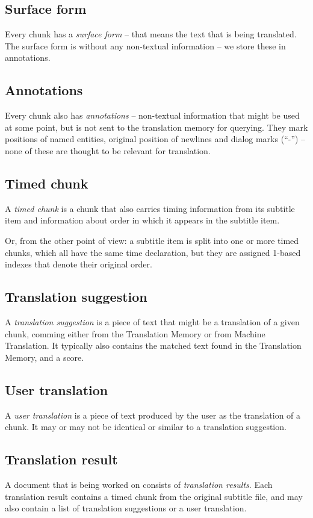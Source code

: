 \subsection*{Surface form}
Every chunk has a \emph{surface form} -- that means the text that is being translated. The surface form is without any non-textual information -- we store these in annotations.

\subsection*{Annotations}
Every chunk also has \emph{annotations} -- non-textual information that might be used at some point, but is not sent to the translation memory for querying. They mark positions of named entities, original position of newlines and dialog marks (``-'') -- none of these are thought to be relevant for translation.

\subsection*{Timed chunk}
A \emph{timed chunk} is a chunk that also carries timing information from its subtitle item and information about order in which it appears in the subtitle item.

Or, from the other point of view: a subtitle item is split into one or more timed chunks, which all have the same time declaration, but they are assigned 1-based indexes that denote their original order.

\subsection*{Translation suggestion}
A \emph{translation suggestion} is a piece of text that might be a translation of a given chunk, comming either from the Translation Memory or from Machine Translation. It typically also contains the matched text found in the Translation Memory, and a score.

\subsection*{User translation}
A \emph{user translation} is a piece of text produced by the user as the translation of a chunk. It may or may not be identical or similar to a translation suggestion.

\subsection*{Translation result}
A document that is being worked on consists of \emph{translation results}. Each translation result contains a timed chunk from the original subtitle file, and may also contain a list of translation suggestions or a user translation.

